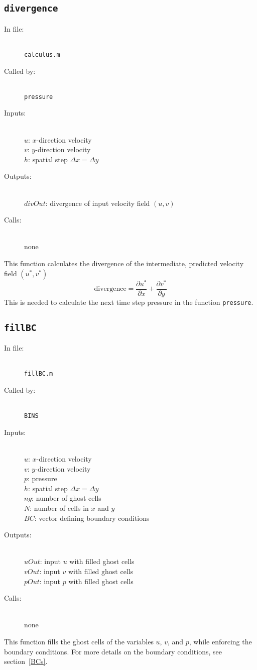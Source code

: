 \documentclass[12pt]{article}
\begin{document}
\subsection{\texttt{divergence}}
\begin{description}
\item[In file:] \hfill \\ \texttt{calculus.m}
\item[Called by:] \hfill \\ \texttt{pressure}
\item[Inputs:] \hfill \\ $u$: $x$-direction velocity \\ $v$: $y$-direction velocity \\ $h$: spatial step $\Delta x = \Delta y$ 
\item[Outputs:] \hfill \\ $divOut$: divergence of input velocity field $(u,v)$
\item[Calls:] \hfill \\ none
\end{description}
This function calculates the divergence of the intermediate, predicted velocity field $(u^*,v^*)$
\[ \text{divergence} = \frac{\partial u^*}{\partial x} + \frac{\partial v^*}{\partial y}\]
This is needed to calculate the next time step pressure in the function \texttt{pressure}.

\subsection{\texttt{fillBC}}
\begin{description}
\item[In file:] \hfill \\ \texttt{fillBC.m}
\item[Called by:] \hfill \\ \texttt{BINS}
\item[Inputs:] \hfill \\ $u$: $x$-direction velocity \\ $v$: $y$-direction velocity \\ $p$: pressure \\ $h$: spatial step $\Delta x = \Delta y$ \\ $ng$: number of ghost cells \\ $N$: number of cells in $x$ and $y$ \\ $BC$: vector defining boundary conditions
\item[Outputs:] \hfill \\ $uOut$: input $u$ with filled ghost cells \\ $vOut$: input $v$ with filled ghost cells \\ $pOut$: input $p$ with filled ghost cells
\item[Calls:] \hfill \\ none
\end{description}
This function fills the ghost cells of the variables $u$, $v$, and $p$, while enforcing the boundary conditions.  For more details on the boundary conditions, see section~\ref{BCs}.
\end{document}
